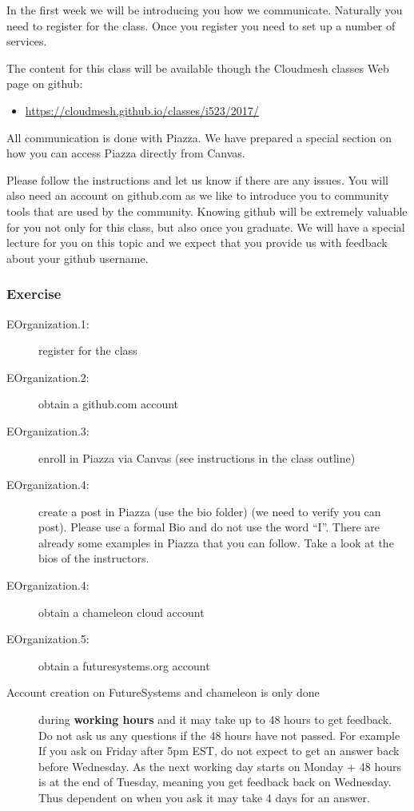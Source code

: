 In the first week we will be introducing you how we communicate.
Naturally you need to register for the class. Once you register you need
to set up a number of services.

The content for this class will be available though the Cloudmesh
classes Web page on github:

\begin{itemize}
\tightlist
\item
  \url{https://cloudmesh.github.io/classes/i523/2017/}
\end{itemize}

All communication is done with Piazza. We have prepared a special
section on how you can access Piazza directly from Canvas.

Please follow the instructions and let us know if there are any issues.
You will also need an account on github.com as we like to introduce you
to community tools that are used by the community. Knowing github will
be extremely valuable for you not only for this class, but also once you
graduate. We will have a special lecture for you on this topic and we
expect that you provide us with feedback about your github username.

\subsubsection{Exercise}\label{exercise}

\begin{description}
\item[EOrganization.1:]
register for the class
\item[EOrganization.2:]
obtain a github.com account
\item[EOrganization.3:]
enroll in Piazza via Canvas (see instructions in the class outline)
\item[EOrganization.4:]
create a post in Piazza (use the bio folder) (we need to verify you can
post). Please use a formal Bio and do not use the word ``I''. There are
already some examples in Piazza that you can follow. Take a look at the
bios of the instructors.
\item[EOrganization.4:]
obtain a chameleon cloud account
\item[EOrganization.5:]
obtain a futuresystems.org account
\end{description}

\begin{description}
\item[Account creation on FutureSystems and chameleon is only done]
during \textbf{working hours} and it may take up to 48 hours to get
feedback. Do not ask us any questions if the 48 hours have not passed.
For example If you ask on Friday after 5pm EST, do not expect to get an
answer back before Wednesday. As the next working day starts on Monday +
48 hours is at the end of Tuesday, meaning you get feedback back on
Wednesday. Thus dependent on when you ask it may take 4 days for an
answer.
\end{description}

